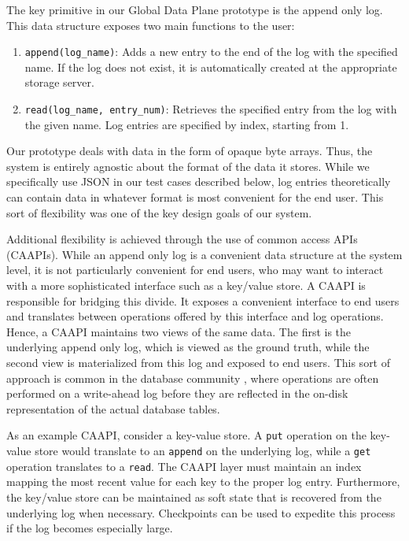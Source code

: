 The key primitive in our Global Data Plane prototype is the append only log. This data structure exposes two main functions to the user:
\begin{enumerate}
\item \texttt{append(log\_name)}: Adds a new entry to the end of the log with the specified name. If the log does not exist, it is automatically created at the appropriate storage server.
\item \texttt{read(log\_name, entry\_num)}: Retrieves the specified entry from the log with the given name. Log entries are specified by index, starting from 1.
\end{enumerate}
Our prototype deals with data in the form of opaque byte arrays. Thus, the system is entirely agnostic about the format of the data it stores. While we specifically use JSON in our test cases described below, log entries theoretically can contain data in whatever format is most convenient for the end user. This sort of flexibility was one of the key design goals of our system.

Additional flexibility is achieved through the use of common access APIs (CAAPIs). While an append only log is a convenient data structure at the system level, it is not particularly convenient for end users, who may want to interact with a more sophisticated interface such as a key/value store. A CAAPI is responsible for bridging this divide. It exposes a convenient interface to end users and translates between operations offered by this interface and log operations. Hence, a CAAPI maintains two views of the same data. The first is the underlying append only log, which is viewed as the ground truth, while the second view is materialized from this log and exposed to end users. This sort of approach is common in the database community \cite{aries}, where operations are often performed on a write-ahead log before they are reflected in the on-disk representation of the actual database tables.

As an example CAAPI, consider a key-value store. A \texttt{put} operation on the key-value store would translate to an \texttt{append} on the underlying log, while a \texttt{get} operation translates to a \texttt{read}. The CAAPI layer must maintain an index mapping the most recent value for each key to the proper log entry. Furthermore, the key/value store can be maintained as soft state that is recovered from the underlying log when necessary. Checkpoints can be used to expedite this process if the log becomes especially large.